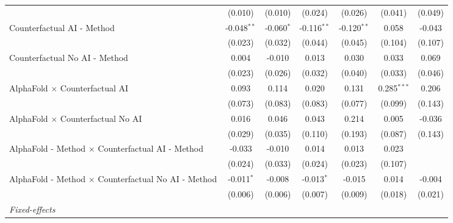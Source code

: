 \begin{tabular}{lcccccc}
                                                              & (0.010)       & (0.010)      & (0.024)       & (0.026)       & (0.041)       & (0.049)\\   
   Counterfactual AI - Method                                 & -0.048$^{**}$ & -0.060$^{*}$ & -0.116$^{**}$ & -0.120$^{**}$ & 0.058         & -0.043\\   
                                                              & (0.023)       & (0.032)      & (0.044)       & (0.045)       & (0.104)       & (0.107)\\   
   Counterfactual No AI - Method                              & 0.004         & -0.010       & 0.013         & 0.030         & 0.033         & 0.069\\   
                                                              & (0.023)       & (0.026)      & (0.032)       & (0.040)       & (0.033)       & (0.046)\\   
   AlphaFold $\times$ Counterfactual AI                       & 0.093         & 0.114        & 0.020         & 0.131         & 0.285$^{***}$ & 0.206\\   
                                                              & (0.073)       & (0.083)      & (0.083)       & (0.077)       & (0.099)       & (0.143)\\   
   AlphaFold $\times$ Counterfactual No AI                    & 0.016         & 0.046        & 0.043         & 0.214         & 0.005         & -0.036\\   
                                                              & (0.029)       & (0.035)      & (0.110)       & (0.193)       & (0.087)       & (0.143)\\   
   AlphaFold - Method $\times$ Counterfactual AI - Method     & -0.033        & -0.010       & 0.014         & 0.013         & 0.023         &   \\   
                                                              & (0.024)       & (0.033)      & (0.024)       & (0.023)       & (0.107)       &   \\   
   AlphaFold - Method $\times$ Counterfactual No AI - Method  & -0.011$^{*}$  & -0.008       & -0.013$^{*}$  & -0.015        & 0.014         & -0.004\\   
                                                              & (0.006)       & (0.006)      & (0.007)       & (0.009)       & (0.018)       & (0.021)\\   
   \midrule
   \emph{Fixed-effects}\\

\end{tabular}
